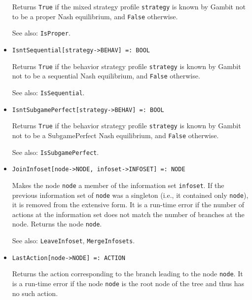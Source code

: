 \begin{itemize}
\bd Returns \verb+True+ if the mixed strategy profile \verb+strategy+
is known by Gambit not to be a proper Nash equilibrium, and \verb+False+
otherwise.  
\item
[See also:] {\tt IsProper}.
\ed

\item
\protect \large \begin{verbatim}
IsntSequential[strategy->BEHAV] =: BOOL
\end{verbatim}\normalsize

\bd Returns \verb+True+ if the behavior strategy profile
\verb+strategy+ is known by Gambit not to be a sequential Nash
equilibrium, and \verb+False+ otherwise. 
\item
[See also:] {\tt IsSequential}.
\ed

\item
\protect \large \begin{verbatim}
IsntSubgamePerfect[strategy->BEHAV] =: BOOL
\end{verbatim}\normalsize

\bd Returns \verb+True+ if the behavior strategy profile
\verb+strategy+ is known by Gambit not to be a SubgamePerfect Nash
equilibrium, and \verb+False+ otherwise. 
\item
[See also:] {\tt IsSubgamePerfect}.
\ed


\item
\protect \large \begin{verbatim}
JoinInfoset[node->NODE, infoset->INFOSET] =: NODE
\end{verbatim}\normalsize

\bd
Makes the node \verb+node+ a member of the information set
\verb+infoset+.  If the previous information set of \verb+node+ was
a singleton (i.e., it contained only \verb+node+), it is removed from the
extensive form.  It is a run-time error if the number of actions at the
information set does not match the number of branches at the node.
Returns the node \verb+node+.
\item
[See also:] {\tt LeaveInfoset}, {\tt MergeInfosets}.
\ed



\item
\protect \large \begin{verbatim} 
LastAction[node->NODE] =: ACTION
\end{verbatim}\normalsize

\bd
Returns the action corresponding to the branch leading to
the node \verb+node+.  It is a run-time error if the node \verb+node+ is
the root node of the tree and thus has no such action.
\ed


\end{itemize}
